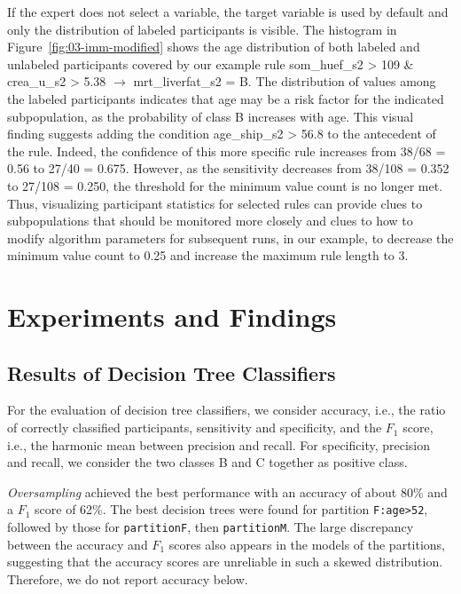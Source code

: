 \documentclass[
  oneside]{book}
\begin{document}
If the expert does not select a variable, the target variable is used by default and only the distribution of labeled participants is visible.
The histogram in Figure~\ref{fig:03-imm-modified} shows the age distribution of both labeled and unlabeled participants covered by our example rule som\_huef\_s2 \textgreater{} 109 \& crea\_u\_s2 \textgreater{} 5.38 \(\longrightarrow\) mrt\_liverfat\_s2 = B.
The distribution of values among the labeled participants indicates that age may be a risk factor for the indicated subpopulation, as the probability of class B increases with age.
This visual finding suggests adding the condition age\_ship\_s2 \textgreater{} 56.8 to the antecedent of the rule.
Indeed, the confidence of this more specific rule increases from 38/68 = 0.56 to 27/40 = 0.675.
However, as the sensitivity decreases from 38/108 = 0.352 to 27/108 = 0.250, the threshold for the minimum value count is no longer met.
Thus, visualizing participant statistics for selected rules can provide clues to subpopulations that should be monitored more closely and clues to how to modify algorithm parameters for subsequent runs, in our example, to decrease the minimum value count to 0.25 and increase the maximum rule length to 3.

\hypertarget{imm-experiments}{%
\section{Experiments and Findings}\label{imm-experiments}}

\hypertarget{imm-experiments-trees}{%
\subsection{Results of Decision Tree Classifiers}\label{imm-experiments-trees}}

For the evaluation of decision tree classifiers, we consider accuracy, i.e., the ratio of correctly classified participants, sensitivity and specificity, and the \(F_1\) score, i.e., the harmonic mean between precision and recall.
For specificity, precision and recall, we consider the two classes B and C together as positive class.

\emph{Oversampling} achieved the best performance with an accuracy of about 80\% and a \(F_1\) score of 62\%.
The best decision trees were found for partition \texttt{F:age\textgreater{}52}, followed by those for \texttt{partitionF}, then \texttt{partitionM}.
The large discrepancy between the accuracy and \(F_1\) scores also appears in the models of the partitions, suggesting that the accuracy scores are unreliable in such a skewed distribution. Therefore, we do not report accuracy below.
\end{document}
